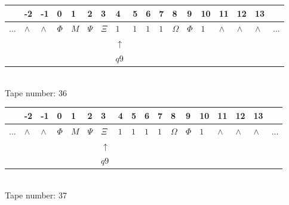\documentclass[11pt]{article}
\begin{document}
\begin{table}[H]
\centering
\begin{tabular}{llllllllllllllllll}
 & -2 & -1 & 0 & 1 & 2 & 3 & 4 & 5 & 6 & 7 & 8 & 9 & 10 & 11 & 12 & 13 & \\
\hline
$...$ & \multicolumn{1}{|l|}{$\wedge$} & \multicolumn{1}{|l|}{$\wedge$} & \multicolumn{1}{|l|}{$\Phi$} & \multicolumn{1}{|l|}{$M$} & \multicolumn{1}{|l|}{$\Psi$} & \multicolumn{1}{|l|}{$\Xi$} & \multicolumn{1}{|l|}{$1$} & \multicolumn{1}{|l|}{$1$} & \multicolumn{1}{|l|}{$1$} & \multicolumn{1}{|l|}{$1$} & \multicolumn{1}{|l|}{$\Omega$} & \multicolumn{1}{|l|}{$\Phi$} & \multicolumn{1}{|l|}{$1$} & \multicolumn{1}{|l|}{$\wedge$} & \multicolumn{1}{|l|}{$\wedge$} & \multicolumn{1}{|l|}{$\wedge$} & $...$\\
\hline
&  &  &  &  &  &  & $\uparrow$ &  &  &  &  &  &  &  &  &  &  \\
&  &  &  &  &  &  & $ q9 $ &  &  &  &  &  &  &  &  &  &  \\
\end{tabular}
\\
Tape number: 36
\noindent\makebox[\linewidth]{\hdashrule{\textwidth}{1pt}{1pt}}\end{table}

\begin{table}[H]
\centering
\begin{tabular}{llllllllllllllllll}
 & -2 & -1 & 0 & 1 & 2 & 3 & 4 & 5 & 6 & 7 & 8 & 9 & 10 & 11 & 12 & 13 & \\
\hline
$...$ & \multicolumn{1}{|l|}{$\wedge$} & \multicolumn{1}{|l|}{$\wedge$} & \multicolumn{1}{|l|}{$\Phi$} & \multicolumn{1}{|l|}{$M$} & \multicolumn{1}{|l|}{$\Psi$} & \multicolumn{1}{|l|}{$\Xi$} & \multicolumn{1}{|l|}{$1$} & \multicolumn{1}{|l|}{$1$} & \multicolumn{1}{|l|}{$1$} & \multicolumn{1}{|l|}{$1$} & \multicolumn{1}{|l|}{$\Omega$} & \multicolumn{1}{|l|}{$\Phi$} & \multicolumn{1}{|l|}{$1$} & \multicolumn{1}{|l|}{$\wedge$} & \multicolumn{1}{|l|}{$\wedge$} & \multicolumn{1}{|l|}{$\wedge$} & $...$\\
\hline
&  &  &  &  &  & $\uparrow$ &  &  &  &  &  &  &  &  &  &  &  \\
&  &  &  &  &  & $ q9 $ &  &  &  &  &  &  &  &  &  &  &  \\
\end{tabular}
\\
Tape number: 37
\noindent\makebox[\linewidth]{\hdashrule{\textwidth}{1pt}{1pt}}\end{table}
\end{document}
